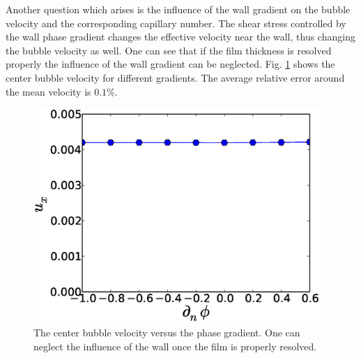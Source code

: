 \documentclass{article}
\begin{document}
Another question which arises is the influence of the wall gradient on the bubble velocity and the
corresponding capillary number. The shear stress controlled by the wall phase gradient changes the
effective velocity near the wall, thus changing the bubble velocity as well.
One can see that if the film thickness is resolved properly the influence of the wall gradient can
be neglected. Fig. \ref{fig:velocities:wall:gradient} shows the center bubble velocity for different
gradients. The average relative error around the mean velocity is $0.1\%$.
\begin{figure}
\includegraphics[width=0.97\textwidth]{Figures/Wall/velocities_grad_profiles.eps}
\caption{The center bubble velocity versus the phase gradient. One can neglect the influence of
the wall once the film is properly resolved.
\label{fig:velocities:wall:gradient}
}
\end{figure}
\end{document}
